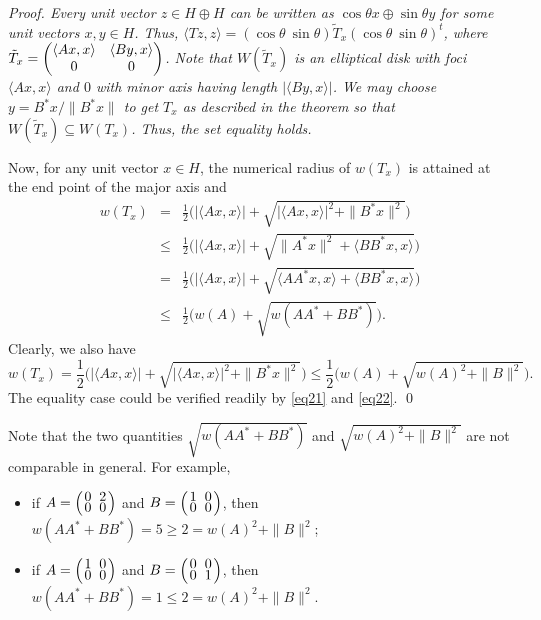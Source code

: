 \documentclass[11pt]{article}
\numberwithin{equation}{section}
\def\la{\langle}
\def\ra{\rangle}
\begin{document}
\it Proof. \rm Every unit vector $z \in H\oplus H$ can be written as $\cos \theta x \oplus \sin \theta y$
for some unit vectors $x, y \in H$. Thus, $\la Tz,z\ra = (\cos\theta \ \sin \theta)
\tilde T_x (\cos\theta \ \sin \theta)^t$, where
$\tilde T_x = \begin{pmatrix} \la Ax,x\ra & \la By,  x\ra\cr 0 & 0 \cr\end{pmatrix}$.
Note that $W(\tilde T_x)$ is an elliptical disk with foci $\la Ax,x\ra$ and $0$
with minor axis having length $|\la By,x\ra|$.
We may choose $y = B^*x/\|B^*x\|$ to get $T_x$ as described in the theorem
so that $W(\tilde T_x) \subseteq W(T_x)$. Thus, the set
equality holds.


Now, for any  unit vector $x \in H$,
the numerical radius of $w(T_x)$ is attained at the end point of the major axis and
\begin{eqnarray}\label{eq21}
w(T_x)
 &=&\frac{1}{2}\Big(|\la Ax,x\ra| + \sqrt{|\la Ax,x\ra|^2 + \|B^*x\|^2}\Big) \nonumber\\
&\le&  \frac{1}{2}\Big(|\la Ax,x\ra| + \sqrt{\|A^*x\|^2 + \la BB^*x,x\ra}\Big) \\
&=&  \frac{1}{2}\Big(|\la Ax,x\ra| + \sqrt{\la AA^*x, x\ra + \la BB^*x, x\ra}\Big)  \nonumber\\
&\le&   \frac{1}{2}\Big(w(A) + \sqrt{w(AA^*+BB^*)}\Big).\nonumber
\end{eqnarray}
Clearly, we also have
\begin{equation}\label{eq22}
w(T_x) =\frac{1}{2}\Big(|\la Ax,x\ra| + \sqrt{|\la Ax,x\ra|^2 + \|B^*x\|^2}\Big)
\le \frac{1}{2} \Big(w(A) + \sqrt{w(A)^2+\|B\|^2}\Big).\end{equation}
The equality case could be verified readily by \eqref{eq21} and \eqref{eq22}.
\qed

\medskip
Note that the two quantities $\sqrt{w(AA^*+BB^*)}$ and $\sqrt{w(A)^2 + \|B\|^2}$ are not comparable
in general.
For example,
\begin{itemize}
\item[(a)] if $A = \left({\textstyle 0\atop  \textstyle 0} \ {\textstyle 2 \atop \textstyle 0}\right)$ and $B = \left({\textstyle 1\atop  \textstyle 0} \ {\textstyle 0 \atop \textstyle 0}\right)$, then
$w(AA^* + BB^*) = 5 \ge 2 = w(A)^2 + \|B\|^2$;
\item[(b)] if $A = \left({\textstyle 1\atop  \textstyle 0} \ {\textstyle 0 \atop \textstyle 0}\right)$ and $B=\left({\textstyle 0\atop  \textstyle 0} \ {\textstyle 0 \atop \textstyle 1}\right)$,
then $w(AA^*+BB^*) = 1 \le 2 = w(A)^2 + \|B\|^2$.
 \end{itemize}
\end{document}
